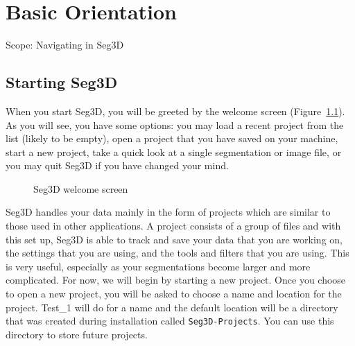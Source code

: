 \documentclass[fleqn,11pt,openany]{book}
\begin{document}

\chapter{Basic Orientation}

\begin{introduction}
Scope: Navigating in Seg3D 
\end{introduction}


\section{Starting Seg3D}

When you start Seg3D, you will be greeted by the welcome screen (Figure~\ref{fig:welcome}).  As you will see, you have some options:  you may load a recent project from the list (likely to be empty), open a project that you have saved on your machine, start a new project, take a quick look at a single segmentation or image file, or you may quit Seg3D if you have changed your mind. 

\begin{figure}
\caption{Seg3D welcome screen}\label{fig:welcome}
\end{figure}

Seg3D handles your data mainly in the form of projects which are similar to those used in other applications.  A project consists of a group of files and with this set up, Seg3D is able to track and save your data that you are working on, the settings that you are using, and the tools and filters that you are using.  This is very useful, especially as your segmentations become larger and more complicated.  For now, we will begin by starting a new project.  Once you choose to open a new project, you will be asked to choose a name and location for the project.  Test\_1 will do for a name and the default location will be a directory that was created during installation called {\tt Seg3D-Projects}. You can use this directory to store future projects.
\end{document}
